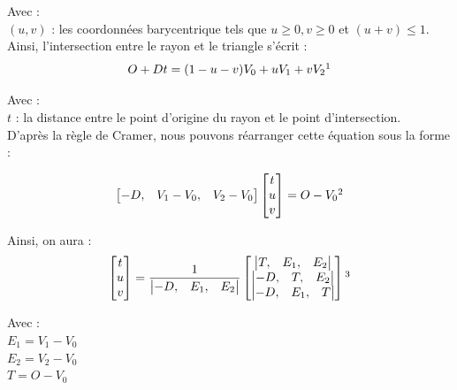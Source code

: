 Avec :  \\
$(u,v)$ : les coordonnées barycentrique tels que $u\geqslant0, v\geqslant0$ et $(u+v)\leqslant1$. \\

Ainsi, l'intersection entre le rayon et le triangle s'écrit :
\begin{equation}
O + Dt = (1-u-v)V_0 + uV_1 + vV_2 \footnotemark
\end{equation}

Avec : \\
$t$ : la distance entre le point d'origine du rayon et le point d'intersection. \\

D'après la règle de Cramer, nous pouvons réarranger cette équation sous la forme :


\begin{equation}
	\begin{bmatrix}
 	  -D, & V_1-V_0, & V_2-V_0
	\end{bmatrix}
	\begin{bmatrix}
 	 t \\
	 u \\
	 v
	\end{bmatrix}
	= O-V_0
	\footnotemark
\end{equation}

Ainsi, on aura :
\begin{equation}
	\begin{bmatrix}
 	 t \\
	 u \\
	 v
	\end{bmatrix}
	=
	\frac{1}{
	\begin{vmatrix}
 	  -D, & E_1, & E_2
	\end{vmatrix}
	}
	\begin{bmatrix}
 	 	\begin{vmatrix}
 		  T, & E_1, & E_2
		\end{vmatrix} \\
 	 	\begin{vmatrix}
 		  -D, & T, & E_2
		\end{vmatrix} \\
 	 	\begin{vmatrix}
 		  -D, & E_1, & T
		\end{vmatrix}
	\end{bmatrix}	
	\footnotemark
\end{equation}

Avec : \\
$E_1 =  V_1-V_0$ \\
$E_2 =  V_2-V_0$ \\
$T = O - V_0$ \\

